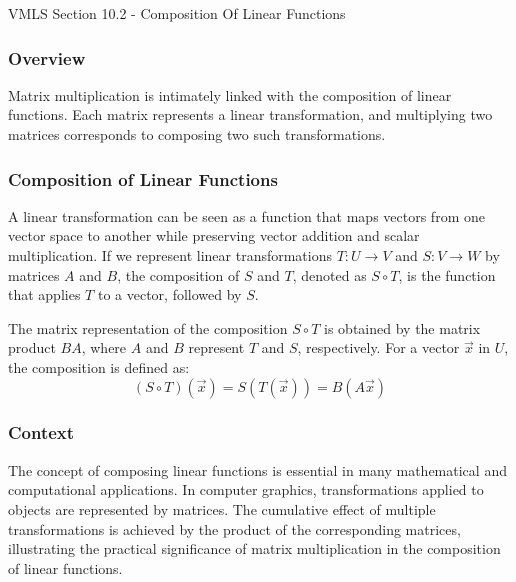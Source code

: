 \begin{notes}{VMLS Section 10.2 - Composition Of Linear Functions}
    \subsubsection*{Overview}

    Matrix multiplication is intimately linked with the composition of linear functions. Each matrix represents a linear transformation, and multiplying two matrices corresponds to composing two such 
    transformations. \vspace*{1em}

    \subsubsection*{Composition of Linear Functions}
    
    A linear transformation can be seen as a function that maps vectors from one vector space to another while preserving vector addition and scalar multiplication. If we represent linear transformations 
    $T: U \rightarrow V$ and $S: V \rightarrow W$ by matrices $A$ and $B$, the composition of $S$ and $T$, denoted as $S \circ T$, is the function that applies $T$ to a vector, followed by $S$. \vspace*{1em}

    \begin{Highlight}
        The matrix representation of the composition $S \circ T$ is obtained by the matrix product $BA$, where $A$ and $B$ represent $T$ and $S$, respectively. For a vector $\vec{x}$ in $U$, the composition 
        is defined as:
        \begin{equation*}
            (S \circ T)(\vec{x}) = S(T(\vec{x})) = B(A\vec{x})
        \end{equation*}
    \end{Highlight}
    
    \subsubsection*{Context}
    
    The concept of composing linear functions is essential in many mathematical and computational applications. In computer graphics, transformations applied to objects are represented by matrices. The 
    cumulative effect of multiple transformations is achieved by the product of the corresponding matrices, illustrating the practical significance of matrix multiplication in the composition of linear functions.
\end{notes}

